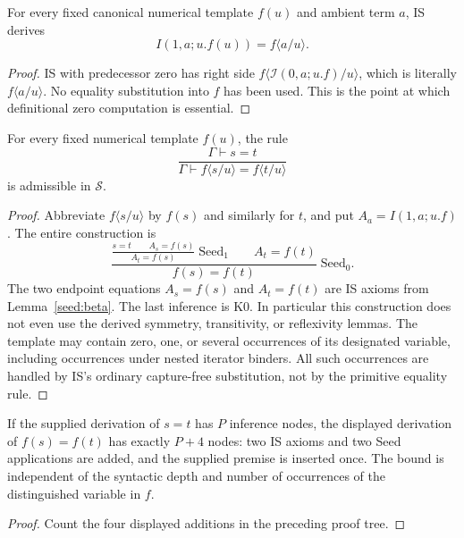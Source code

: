 \begin{lemma}\label{seed:beta}
For every fixed canonical numerical template $f(u)$ and ambient term $a$,
IS derives
\[
 I(1,a;u.f(u))=f\langle a/u\rangle.
 \tag{Beta1}\label{seed:betaeq}
\]
\end{lemma}
\begin{proof}
IS with predecessor zero has right side
$f\langle\mathcal I(0,a;u.f)/u\rangle$, which is literally
$f\langle a/u\rangle$. No equality substitution into $f$ has been
used. This is the point at which definitional zero computation is essential.
\end{proof}

\begin{theorem}\label{seed:congruence}
For every fixed numerical template $f(u)$, the rule
\[
 \frac{\Gamma\vdash s=t}
 {\Gamma\vdash f\langle s/u\rangle=f\langle t/u\rangle}
\]
is admissible in $\mathcal S$.
\end{theorem}
\begin{proof}
Abbreviate $f\langle s/u\rangle$ by $f(s)$ and similarly for $t$,
and put $A_a=I(1,a;u.f)$.
The entire construction is
\[
 \frac{
   \displaystyle\frac{s=t\qquad A_s=f(s)}{A_t=f(s)}\;\mathrm{Seed}_1
   \qquad A_t=f(t)
 }{f(s)=f(t)}\;\mathrm{Seed}_0.
\]
The two endpoint equations $A_s=f(s)$ and $A_t=f(t)$ are IS axioms
from Lemma~\ref{seed:beta}. The last inference is K0.
In particular this construction does not even use the derived
symmetry, transitivity, or reflexivity lemmas.
The template may contain zero, one, or several occurrences of its
designated variable, including occurrences under nested iterator binders.
All such occurrences are handled by IS's ordinary capture-free
substitution, not by the primitive equality rule.
\end{proof}

\begin{proposition}\label{seed:nodes}
If the supplied derivation of $s=t$ has $P$ inference nodes, the displayed
derivation of $f(s)=f(t)$ has exactly $P+4$ nodes: two IS axioms and two
Seed applications are added, and the supplied premise is inserted once.
The bound is independent of the syntactic depth and number of occurrences
of the distinguished variable in $f$.
\end{proposition}
\begin{proof}
Count the four displayed additions in the preceding proof tree.
\end{proof}

